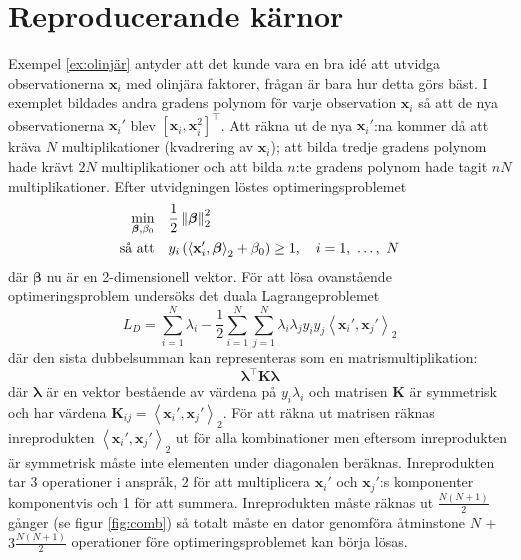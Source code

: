 \documentclass[a4paper, 12pt]{report}
\theoremstyle{definition}
\theoremstyle{remark}
\newcommand{\bfbeta}{{\boldsymbol{\beta}}}
\newcommand{\bfx}{\mathbf{x}}
\newcommand{\llangle}{\left\langle}
\newcommand{\rrangle}{\right\rangle}
\newcommand{\inner}[2]{\llangle #1, #2 \rrangle}
\begin{document}
\chapter{Reproducerande kärnor}
Exempel \ref{ex:olinjär} antyder att det kunde vara en bra idé att utvidga observationerna $\mathbf{x}_i$ med olinjära faktorer, frågan är bara hur detta görs bäst. I exemplet bildades andra gradens polynom för varje observation $\bfx_i$ så att de nya observationerna $\bfx_i'$ blev $\left[\bfx_i, \bfx_i^2\right]^\intercal$. Att räkna ut de nya $\bfx_i'$:na kommer då att kräva $N$ multiplikationer (kvadrering av $\bfx_i$); att bilda tredje gradens polynom hade krävt $2N$ multiplikationer och att bilda $n$:te gradens polynom hade tagit $nN$ multiplikationer. Efter utvidgningen löstes optimeringsproblemet 
\begin{equation*}
\begin{aligned}
\operatornamewithlimits{min}_{\bfbeta, \beta_0} & & &\frac{1}{2}\left\|\bfbeta
\right\|_2^2\\
\text{så att} & & &y_i\left(\inner{\bfx_i'}{\bfbeta}_2+\beta_0\right)\geq 1,\quad i=1,~\dots,~N
\end{aligned}
\end{equation*}
där $\bfbeta$ nu är en 2-dimensionell vektor. För att lösa ovanstående optimeringsproblem undersöks det duala Lagrangeproblemet
\begin{equation*}
		L_D= \sum_{i=1}^{N}\lambda_i - \frac{1}{2}\sum_{i=1}^{N}\sum_{j=1}^{N}\lambda_i\lambda_jy_iy_j\inner{\bfx_i'}{\bfx_j'}_2
\end{equation*}
där den sista dubbelsumman kan representeras som en matrismultiplikation:
\begin{equation*}
	\boldsymbol{\lambda}^\intercal\mathbf{K}\boldsymbol{\lambda}
\end{equation*}
där $\boldsymbol{\lambda}$ är en vektor bestående av värdena på $y_i\lambda_i$ och matrisen $\mathbf{K}$ är symmetrisk och har värdena $\mathbf{K}_{ij}=\inner{\bfx_i'}{\bfx_j'}_2$. För att räkna ut matrisen räknas inreprodukten $\inner{\bfx_i'}{\bfx_j'}_2$ ut för alla kombinationer men eftersom inreprodukten är symmetrisk måste inte elementen under diagonalen beräknas. Inreprodukten tar 3 operationer i anspråk, 2 för att multiplicera $\bfx_i'$ och $\bfx_j'$:s komponenter komponentvis och 1 för att summera. Inreprodukten måste räknas ut $\frac{N(N+1)}{2}$ gånger (se figur \ref{fig:comb}) så totalt måste en dator genomföra åtminstone $N$ + $3\frac{N(N+1)}{2}$ operationer före optimeringsproblemet kan börja lösas.
\end{document}
